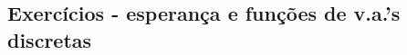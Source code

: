 \documentclass[../Notas.tex]{subfiles}
\begin{document}
\subsection{Exercícios - esperança e funções de v.a.'s discretas}
\end{document}

